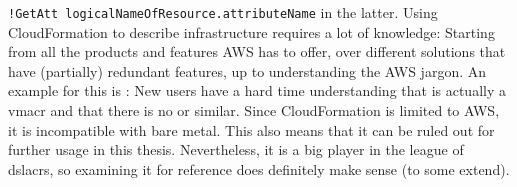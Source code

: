 \newline %
\texttt{!GetAtt logicalNameOfResource.attributeName} in the latter.
\newline
Using CloudFormation to describe infrastructure requires a lot of knowledge: Starting from all the products and features AWS has to offer, over different solutions that have (partially) redundant features, up to understanding the AWS jargon. An example for this is : New users have a hard time understanding that  is actually a \gls{vmacr} and that there is no  or similar.
\newline
Since CloudFormation is limited to AWS, it is incompatible with bare metal. This also means that it can be ruled out for further usage in this thesis. Nevertheless, it is a big player in the league of \gls{dslacr}s, so examining it for reference does definitely make sense (to some extend).


